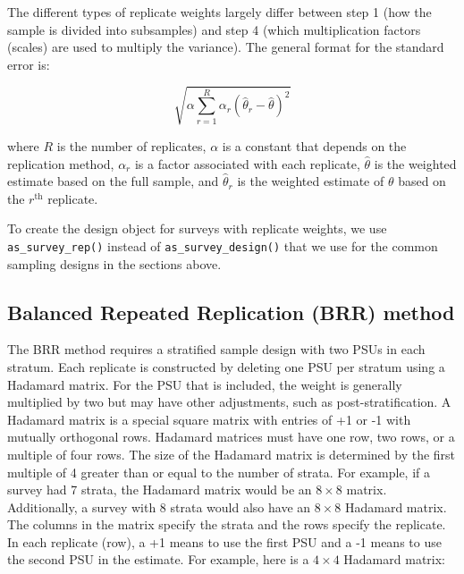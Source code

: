 \documentclass[
]{krantz}
\begin{document}
The different types of replicate weights largely differ between step 1 (how the sample is divided into subsamples) and step 4 (which multiplication factors (scales) are used to multiply the variance). The general format for the standard error is:

\[ \sqrt{\alpha \sum_{r=1}^R \alpha_r (\hat{\theta}_r - \hat{\theta})^2 }\]

where \(R\) is the number of replicates, \(\alpha\) is a constant that depends on the replication method, \(\alpha_r\) is a factor associated with each replicate, \(\hat{\theta}\) is the weighted estimate based on the full sample, and \(\hat{\theta}_r\) is the weighted estimate of \(\theta\) based on the \(r^{\text{th}}\) replicate.

To create the design object for surveys with replicate weights, we use \texttt{as\_survey\_rep()} instead of \texttt{as\_survey\_design()} that we use for the common sampling designs in the sections above.

\hypertarget{balanced-repeated-replication-brr-method}{%
\subsection{Balanced Repeated Replication (BRR) method}\label{balanced-repeated-replication-brr-method}}

The BRR method requires a stratified sample design with two PSUs in each stratum. Each replicate is constructed by deleting one PSU per stratum using a Hadamard matrix. For the PSU that is included, the weight is generally multiplied by two but may have other adjustments, such as post-stratification. A Hadamard matrix is a special square matrix with entries of +1 or -1 with mutually orthogonal rows. Hadamard matrices must have one row, two rows, or a multiple of four rows. The size of the Hadamard matrix is determined by the first multiple of 4 greater than or equal to the number of strata. For example, if a survey had 7 strata, the Hadamard matrix would be an \(8\times8\) matrix. Additionally, a survey with 8 strata would also have an \(8\times8\) Hadamard matrix. The columns in the matrix specify the strata and the rows specify the replicate. In each replicate (row), a +1 means to use the first PSU and a -1 means to use the second PSU in the estimate. For example, here is a \(4\times4\) Hadamard matrix:
\end{document}
